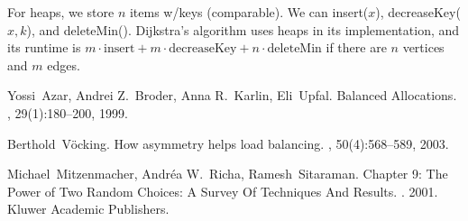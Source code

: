 \documentclass[11pt]{article}
\begin{document}
For heaps, we store $n$ items w/keys (comparable). We can insert($x$), decreaseKey($x, k$),
and deleteMin(). Dijkstra's algorithm uses heaps in its implementation, and its runtime is
$m \cdot \text{insert} + m \cdot \text{decreaseKey} + n \cdot \text{deleteMin}$ if there are $n$
vertices and $m$ edges.




\begin{thebibliography}{42}

Yossi~Azar, Andrei Z.~Broder, Anna R.~Karlin, Eli~Upfal.
\newblock Balanced Allocations.
, 29(1):180--200, 1999.

Berthold~V\"ocking.
\newblock How asymmetry helps load balancing.
, 50(4):568--589, 2003.

Michael~Mitzenmacher, Andr\'{e}a W.~Richa, Ramesh~Sitaraman.
\newblock Chapter 9: The Power of Two Random Choices:
A Survey Of Techniques And Results.
. 2001. Kluwer Academic Publishers.
\newblock

\end{thebibliography}
\end{document}
